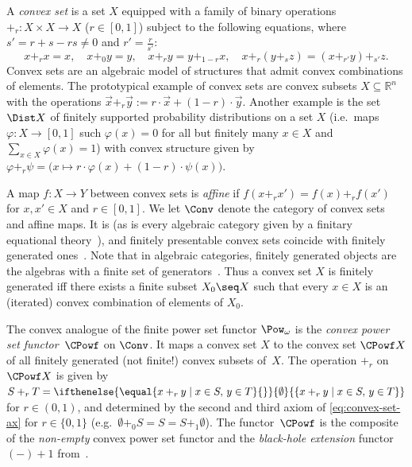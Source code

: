 \documentclass[a4paper,UKenglish, autoref, numberwithinsect, final]{lipics-v2021}
\numberwithin{equation}{section}
\newcommand{\set}[2][]{%
  \ifthenelse{\equal{#2}{}}{%
    \ensuremath{{#1\emptyset}}%
  }{%
    \ensuremath{{#1\{#2#1\}}}%
  }%
}
\theoremstyle{plain}
\theoremstyle{definition}
\begin{document}
A \emph{convex set} is a set \(X\) equipped with a family of binary operations \( +_{r}  \colon X \times X \rightarrow X\) (\(r \in [0, 1]\)) subject to the following equations, where \(s' = r + s -rs \ne 0\) and \(r' = \frac{r}{s'}\): 
  \begin{equation}\label{eq:convex-set-ax} x +_{r} x = x,
    \quad
    x +_{0} y = y,
    \quad
    x +_{r} y = y +_{1-r} x,
    \quad
    x +_{r} (y +_{s} z) = (x +_{r'} y ) +_{s'} z.
  \end{equation}
Convex sets are an algebraic model of structures that admit convex combinations of elements. The prototypical example of convex sets are convex subsets $X\subseteq \mathbb{R}^n$ with the operations $\vec x +_r \vec y := r\cdot \vec x
+ (1-r)\cdot \vec y$. Another example is the set $\Dist X$ of finitely supported probability distributions on a set $X$ (i.e.\ maps $\varphi\colon X\to [0,1]$ such $\varphi(x)=0$ for all but finitely many $x\in X$ and $\sum_{x\in X} \varphi(x) = 1$) with convex structure given by $\varphi+_r \psi = \big(x \mapsto r \cdot \varphi(x) + (1-r) \cdot \psi(x)\big)$.

 A map \(f \colon X \rightarrow Y\) between convex sets  %
  is \emph{affine} if \(f(x +_{r} x') = f(x) +_{r} f(x')\) for \(x, x' \in X\) and \(r \in [0, 1]\). We let $\Conv$ denote the category of convex sets and affine maps. It is \lfp (as is every algebraic category given by a finitary equational theory~\cite{adamek_rosicky_1994}), and finitely presentable convex sets coincide with finitely generated ones~\cite[Cor.~5.5]{sw15}. Note that in algebraic categories, finitely generated objects are the algebras with a finite set of generators~\cite[Ex.~1.68]{adamek_rosicky_1994}. Thus a convex set $X$ is finitely generated iff there exists a finite subset $X_0\seq X$ such that every $x\in X$ is an (iterated) convex combination of elements of $X_0$. 

The convex analogue of the finite power set functor $\Pow_\omega$ is the \emph{convex power set functor}~$\CPowf$ on $\Conv$. It maps a convex set $X$ to the convex set $\CPowf X$ of all finitely generated (not finite!) convex subsets of~$X$. The operation $+_r$ on $\CPowf X$ is given by $S+_r T = \set{x+_r y \mid x\in S,\, y\in T}$ for $r\in (0,1)$, and determined by the second and third axiom of \eqref{eq:convex-set-ax} for $r\in \{0,1\}$ (e.g.\ $\emptyset +_0 S = S = S+_1 \emptyset$). The functor~$\CPowf$ is the composite of the \emph{non-empty} convex power set functor and the \emph{black-hole extension} functor $(-)+1$ from~\cite[Sec.~5]{bss17}.
\end{document}
